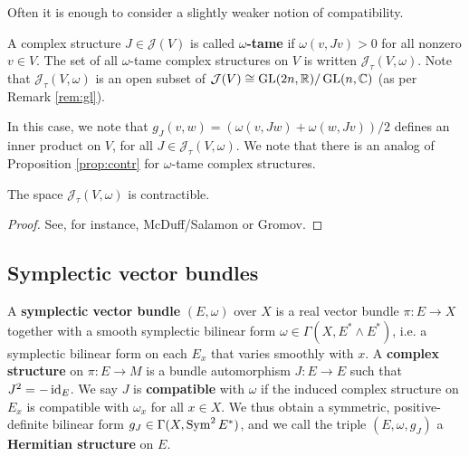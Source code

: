 \documentclass{amsart}
\begin{document}
Often it is enough to consider a slightly weaker notion of compatibility.
\begin{definition}
    A complex structure $J\in\mathcal{J}(V)$ is called \textbf{$\omega$-tame} if $\omega(v,Jv)>0$
    for all nonzero $v\in V$. The set of all $\omega$-tame complex structures on $V$ is
    written $\mathcal{J}_{\tau}(V,\omega)$. Note that $\mathcal{J}_\tau(V,\omega)$ is an
    open subset of $\mathcal{J}(V)\cong\operatorname{GL}(2n,\mathbb{R})/\operatorname{GL}(n,\mathbb{C})$ (as per Remark \ref{rem:gl}).
\end{definition}
In this case, we note that $g_J(v,w)=(\omega(v,Jw)+\omega(w,Jv))/2$ defines an inner product on $V$,
for all $J\in\mathcal{J}_\tau(V,\omega)$. We note that there is an analog of Proposition \ref{prop:contr}
for $\omega$-tame complex structures.

\begin{proposition}
    The space $\mathcal{J}_\tau(V,\omega)$ is contractible.
\end{proposition}
\begin{proof}
    See, for instance, McDuff/Salamon or Gromov.
\end{proof}



\subsection{Symplectic vector bundles}

\begin{definition}
    A \textbf{symplectic vector bundle} $(E,\omega)$ over $X$ is a real vector bundle
    $\pi:E\to X$ together with a smooth symplectic bilinear form $\omega\in\Gamma(X,E^*\wedge E^*)$,
    i.e. a symplectic bilinear form on each $E_x$ that varies smoothly with $x$.
    A \textbf{complex structure} on $\pi:E\to M$ is a bundle automorphism $J:E\to E$
    such that $J^2=-\operatorname{id}_{E}$. We say $J$ is \textbf{compatible} with $\omega$ if the
    induced complex structure on $E_x$ is compatible with $\omega_x$ for all $x\in X$.
    We thus obtain a symmetric, positive-definite bilinear form
    $g_J\in\Gamma(X,\operatorname{Sym}^2 E^*)$, and we call the triple $(E, \omega, g_J)$ a
    \textbf{Hermitian structure} on $E$.
\end{definition}
\end{document}
